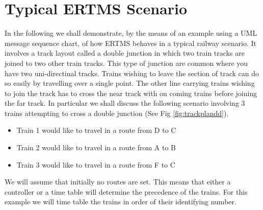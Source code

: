 \section{Typical  ERTMS Scenario}
In the following we shall demonstrate, by the means of an example using a UML message sequence chart, of how ERTMS behaves in a typical railway scenario. It involves a track layout called a double junction in which two train tracks are joined to two other train tracks. This type of junction are common where you have two uni-directinal tracks. Trains wishing to leave the section of track can do so easily by travelling over a single point. The other line carrying trains wishing to join the track has to cross the near track with on coming trains before joining the far track. In particular we shall discuss the following scenario involving 3 trains attempting to cross a double junction (See Fig \ref{fig:trackplandd}). 

\begin{itemize}
\item Train 1 would like to travel in a route from D to C
\item Train 2 would like to travel in a route from A to B
\item Train 3 would like to travel in a route from F to C
\end{itemize}

We will assume that initially no routes are set. This means that either a controller or a time table will determine the precedence of the trains. For this example we will time table the trains in order of their identifying number.



